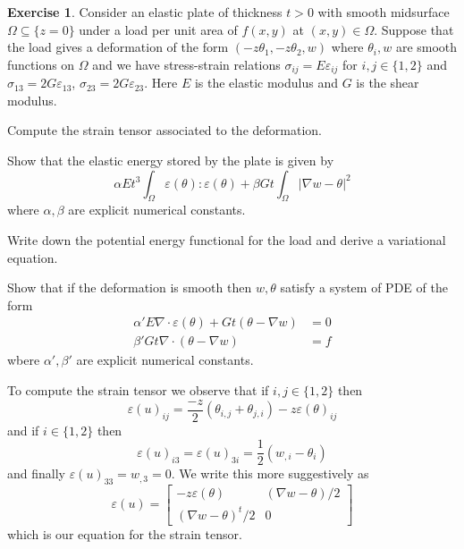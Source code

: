 \documentclass[10pt]{article}
\theoremstyle{definition}
\newtheorem{exer}{Exercise}
\begin{document}
\begin{exer}
Consider an elastic plate of thickness $t > 0$ with smooth midsurface $\Omega \subseteq \{z = 0\}$ under a load per unit area of $f(x, y)$ at $(x, y) \in \Omega$.
Suppose that the load gives a deformation of the form $(-z\theta_1, -z\theta_2, w)$ where $\theta_i, w$ are smooth functions on $\Omega$ and we have stress-strain relations $\sigma_{ij} = E\varepsilon_{ij}$ for $i,j \in \{1, 2\}$ and $\sigma_{13} = 2G\varepsilon_{13}$, $\sigma_{23} = 2G\varepsilon_{23}$.
Here $E$ is the elastic modulus and $G$ is the shear modulus.

Compute the strain tensor associated to the deformation.

Show that the elastic energy stored by the plate is given by
$$\alpha Et^3 \int_\Omega \varepsilon(\theta):\varepsilon(\theta) + \beta Gt \int_\Omega |\nabla w - \theta|^2$$
where $\alpha,\beta$ are explicit numerical constants.

Write down the potential energy functional for the load and derive a variational equation.

Show that if the deformation is smooth then $w,\theta$ satisfy a system of PDE of the form
\begin{align*}
\alpha' E \nabla \cdot \varepsilon(\theta) + Gt(\theta - \nabla w) &= 0\\
\beta' Gt \nabla \cdot(\theta - \nabla w) &= f
\end{align*}
wbere $\alpha',\beta'$ are explicit numerical constants.
\end{exer}

To compute the strain tensor we observe that
if $i, j \in \{1, 2\}$ then
$$\varepsilon(u)_{ij} = \frac{-z}{2}(\theta_{i,j} + \theta_{j,i}) -z\varepsilon(\theta)_{ij}$$
and if $i \in \{1, 2\}$ then
$$\varepsilon(u)_{i3} = \varepsilon(u)_{3i} = \frac{1}{2} (w_{,i} - \theta_i)$$
and finally $\varepsilon(u)_{33} = w_{,3} = 0$.
We write this more suggestively as
$$\varepsilon(u) = \begin{bmatrix}-z\varepsilon(\theta) & (\nabla w - \theta)/2 \\ (\nabla w - \theta)^t/2 & 0\end{bmatrix}$$
which is our equation for the strain tensor.
\end{document}
